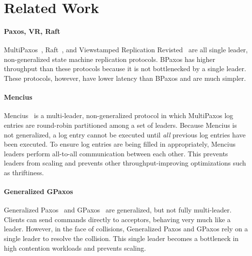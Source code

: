 \section{Related Work}

\paragraph{Paxos, VR, Raft}
MultiPaxos~\cite{lamport1998part, lamport2001paxos, van2015paxos,
lampson2001abcd, mazieres2007paxos}, Raft~\cite{mazieres2007paxos}, and
Viewstamped Replication Revisted~\cite{liskov2012viewstamped} are all single
leader, non-generalized state machine replication protocols. BPaxos has higher
throughput than these protocols because it is not bottlenecked by a single
leader. These protocols, however, have lower latency than BPaxos and are much
simpler.

\paragraph{Mencius}
Mencius~\cite{mao2008mencius} is a multi-leader, non-generalized protocol in
which MultiPaxos log entries are round-robin partitioned among a set of
leaders. Because Mencius is not generalized, a log entry cannot be executed
until \emph{all} previous log entries have been executed. To ensure log entries
are being filled in appropriately, Mencius leaders perform all-to-all
communication between each other. This prevents leaders from scaling and
prevents other throughput-improving optimizations such as thriftiness.

\paragraph{Generalized GPaxos}
Generalized Paxos~\cite{lamport2005generalized} and GPaxos~\cite{sutra2011fast}
are generalized, but not fully multi-leader. Clients can send commands directly
to acceptors, behaving very much like a leader. However, in the face of
collisions, Generalized Paxos and GPaxos rely on a single leader to resolve the
collision. This single leader becomes a bottleneck in high contention workloads
and prevents scaling.

